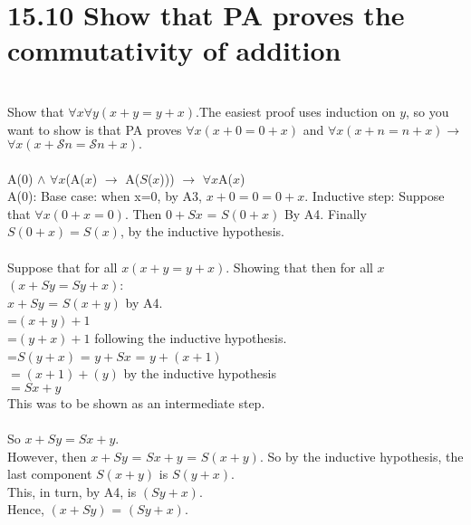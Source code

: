 \documentclass{article}
\begin{document}
\section*{15.10 Show that PA proves the commutativity of addition}\\
Show that $\forall$$x$$\forall$$y$$(x+y = y+x)$.The easiest proof uses induction on $y$, so you want to show is that PA proves $\forall$$x$$(x+0 = 0+x)$ and $\forall$$x$$(x+n = n+x) \rightarrow$ $\forall$$x$$(x + \mathcal{S}n = \mathcal{S}n + x).$\\\\
A(0) $\wedge$ $\forall$$x$(A($x$) $\rightarrow$ A($S$($x$))) $\rightarrow$ $\forall$$x$A($x$)\\
A(0): Base case: when x=0, by A3, $x+0=0= 0+x$. Inductive step: Suppose that $\forall x(0+x=0)$. Then $0 + Sx$ = $S(0+x)$ By A4. Finally $S(0+x)=S(x)$, by the inductive hypothesis.\\
\\
Suppose that for all $x (x+y=y+x)$. Showing that then for all $x$ $(x+Sy=Sy+x)$: \\
$x + Sy$ = $S(x+y)$ by A4.\\
=$(x+y)+1$\\
=$(y+x)+1$ following the inductive hypothesis.\\
=$S(y+x)$ = $y + Sx$ = $y + (x + 1)$\\
$=(x+1) + (y)$ by the inductive hypothesis\\
$=Sx+y$\\  This was to be shown as an intermediate step.\\
\\So  $x+Sy=Sx+y$.\\
However, then $x+Sy$ = $Sx+y$ = $S(x+y)$. So by the inductive hypothesis, the last component $S(x+y)$ is $S(y+x)$.\\
This, in turn, by A4, is $(Sy+x)$. \\
Hence, $(x+Sy)$ = $(Sy+x)$.
\end{document}
